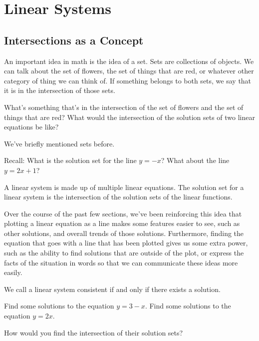 \chapter{Linear Systems}
\section{Intersections as a Concept}

An important idea in math is the idea of a set.  Sets are collections of objects.  We can talk about the set of flowers, the set of things that are red, or whatever other category of thing we can think of.  If something belongs to both sets, we say that it is in the intersection of those sets.


\begin{prblm}
What's something that's in the intersection of the set of flowers and the set of things that are red?
What would the intersection of the solution sets of two linear equations be like?
\vspace{5cm}
\end{prblm}


We've briefly mentioned sets before.

Recall: What is the solution set for the line $y=-x$? What about the line $y=2x+1$?


\begin{defn}
A linear system is made up of multiple linear equations. The solution set for a linear system is the intersection of the solution sets of the linear functions. 
\end{defn}

Over the course of the past few sections, we've been reinforcing this idea that plotting a linear equation as a line makes some features easier to see, such as other solutions, and overall trends of those solutions.  Furthermore, finding the equation that goes with a line that has been plotted gives us some extra power, such as the ability to find solutions that are outside of the plot, or express the facts of the situation in words so that we can communicate these ideas more easily.

\begin{defn}
We call a linear system consistent if and only if there exists a solution.	
\end{defn}

\begin{prblm}
Find some solutions to the equation $y = 3 - x$.
Find some solutions to the equation $y = 2x$.

How would you find the intersection of their solution sets?

\vspace{5.5cm}
\end{prblm}

